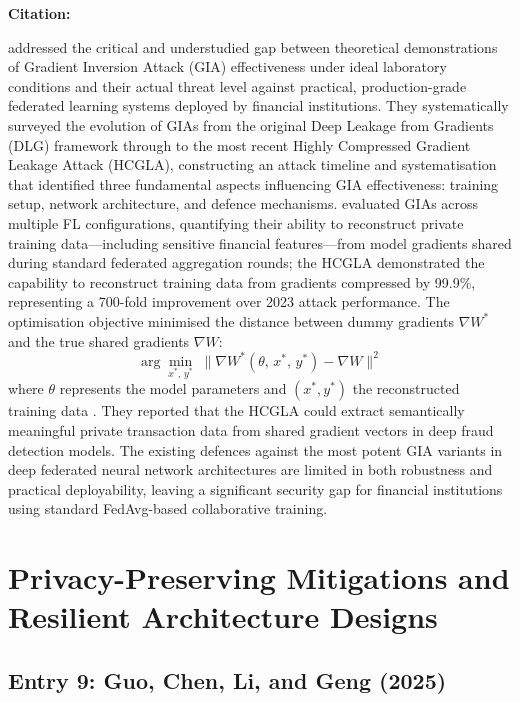\documentclass[12pt, a4paper]{article}
\newenvironment{surveyentry}[1]{%
  \vspace{6pt}
  \noindent\textbf{\color{navyblue}#1}\par
  \vspace{2pt}
  \noindent\hspace{1em}%
  \begin{minipage}[t]{0.97\linewidth}
}{%
  \end{minipage}
  \vspace{10pt}
}
\begin{document}
\begin{surveyentry}{Citation: \cite{du2025hcgla}}
\cite{du2025hcgla} addressed the critical and understudied gap between theoretical demonstrations of Gradient Inversion Attack (GIA) effectiveness under ideal laboratory conditions and their actual threat level against practical, production-grade federated learning systems deployed by financial institutions. They systematically surveyed the evolution of GIAs from the original Deep Leakage from Gradients (DLG) framework through to the most recent Highly Compressed Gradient Leakage Attack (HCGLA), constructing an attack timeline and systematisation that identified three fundamental aspects influencing GIA effectiveness: training setup, network architecture, and defence mechanisms. \cite{du2025hcgla} evaluated GIAs across multiple FL configurations, quantifying their ability to reconstruct private training data---including sensitive financial features---from model gradients shared during standard federated aggregation rounds; the HCGLA demonstrated the capability to reconstruct training data from gradients compressed by 99.9\%, representing a 700-fold improvement over 2023 attack performance. The optimisation objective minimised the distance between dummy gradients $\nabla W^{*}$ and the true shared gradients $\nabla W$:
\[
  \arg\min_{x^{*},\, y^{*}} \;\bigl\| \nabla W^{*}(\theta,\, x^{*},\, y^{*}) - \nabla W \bigr\|^{2}
\]
where $\theta$ represents the model parameters and $(x^{*}, y^{*})$ the reconstructed training data \cite{du2025hcgla}. They reported that the HCGLA could extract semantically meaningful private transaction data from shared gradient vectors in deep fraud detection models. The existing defences against the most potent GIA variants in deep federated neural network architectures are limited in both robustness and practical deployability, leaving a significant security gap for financial institutions using standard FedAvg-based collaborative training.
\end{surveyentry}

\section{Privacy-Preserving Mitigations and Resilient Architecture Designs}

\subsection*{Entry 9: Guo, Chen, Li, and Geng (2025)}
\end{document}
